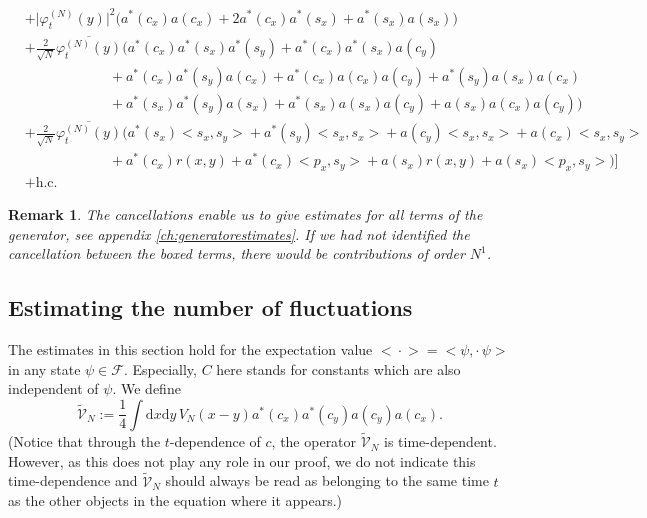 \documentclass[11pt,a4paper,DIV11]{scrartcl}	%
\newtheorem*{rem}{Remark}
\newcommand{\fock}{\mathcal{F}}		%
\newcommand{\di}{\textrm{d}}		%
\newcommand{\tilV}{\tilde{\mathcal{V}}_N}		%
\newcommand{\hc}{\mbox{h.c.}}		%
\newcommand{\scal}[2]{\big<#1,#2\big>} %
\newcommand{\cc}[1]{\overline{#1}}	%
\newcommand{\ev}[1]{\big<#1\big>}	%
\newcommand{\ph}{\varphi_t^{(N)}}	%
\newcommand{\bd}{\begin{displaymath}}			%
\newcommand{\ed}{\end{displaymath}}
\begin{document}
\begin{align}
& + \lvert \ph(y) \rvert^2 \Big( a^*(c_x) a(c_x) + 2 a^*(c_x) a^*(s_x) + a^*(s_x) a(s_x) \Big) \label{l20}\\
& + \frac{2}{\sqrt{N}}\cc{\ph(y)} \bigg(    a^*(c_x) a^*(s_x) a^*(s_y) + a^*(c_x) a^*(s_x) a(c_y) \label{l21}\\
					    & \qquad\qquad\qquad + a^*(c_x) a^*(s_y) a(c_x) + a^*(c_x) a(c_x) a(c_y) + a^*(s_y) a(s_x) a(c_x) \label{l22}\\
					    & \qquad\qquad\qquad + a^*(s_x) a^*(s_y) a(s_x) + a^*(s_x) a(s_x) a(c_y) + a(s_x) a(c_x) a(c_y)  \bigg) \label{l23}\\
& + \frac{2}{\sqrt{N}}\cc{\ph(y)} \bigg(    a^*(s_x) \scal{s_x}{s_y} + a^*(s_y) \scal{s_x}{s_x}  + a(c_y) \scal{s_x}{s_x} + 							a(c_x) \scal{s_x}{s_y} \label{l24}\\
					    & \qquad\qquad\qquad + a^*(c_x)r(x,y) + a^*(c_x)\scal{p_x}{s_y} + a(s_x)r(x,y) + 			a(s_x)\scal{p_x}{s_y}		\bigg)    \Big] \label{l25}\\
&+ \hc \nonumber
\end{align}

\begin{rem}The cancellations enable us to give estimates for all terms of the generator, see appendix \ref{ch:generatorestimates}. If we had not identified the cancellation between the boxed terms, there would be contributions of order $N^1$.
\end{rem}


\subsection{Estimating the number of fluctuations}
\label{ss:number}
The estimates in this section hold for the expectation value $\ev{\cdot} =
\scal{\psi}{\cdot\,\psi}$ in any state $\psi \in \fock$. Especially, $C$ here stands for constants which are also independent of $\psi$. 
We define
\bd
\tilV := \frac{1}{4} \int \di x\di y\, V_N(x-y) a^\ast(c_x) a^\ast(c_y)a(c_y)a(c_x).
\ed
(Notice that through the $t$-dependence of $c$, the operator $\tilV$ is time-dependent. However, as this does not play any role in our proof, we do not indicate this time-dependence and $\tilV$ should always be read as belonging to the same time $t$ as the other objects in the equation where it appears.)
\end{document}
